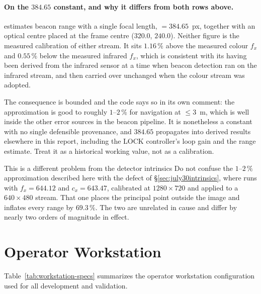\paragraph{On the $384.65$ constant, and why it differs from both rows above.}
 estimates beacon range with a single focal length,
 $=384.65$~px, together with an optical centre placed at the
frame centre ($320.0$, $240.0$). Neither figure is the measured calibration of
either stream. It sits $1.16\,\%$ above the measured colour $f_x$ and
$0.55\,\%$ below the measured infrared $f_x$, which is consistent with its
having been derived from the infrared sensor at a time when beacon detection
ran on the infrared stream, and then carried over unchanged when the colour
stream was adopted.

The consequence is bounded and the code says so in its own comment: the
approximation is good to roughly $1$--$2\,\%$ for navigation at $\leq 3$~m,
which is well inside the other error sources in the beacon pipeline. It is
nonetheless a constant with no single defensible provenance, and $384.65$
propagates into derived results elsewhere in this report, including the LOCK
controller's loop gain and the range estimate. Treat it as a historical
working value, not as a calibration.

\begin{trapbox}{This is a different problem from the detector intrinsics}
Do not confuse the $1$--$2\,\%$ approximation described here with the defect
of \S\ref{sec:july30intrinsics}, where  runs with
$f_x = 644.12$ and $c_x = 643.47$, calibrated at $1280\times720$ and applied
to a $640\times480$ stream. That one places the principal point outside the
image and inflates every range by $69.3\,\%$. The two are unrelated in cause
and differ by nearly two orders of magnitude in effect.
\end{trapbox}

\section{Operator Workstation}

Table~\ref{tab:workstation-specs} summarizes the operator workstation configuration used for all development and validation.

